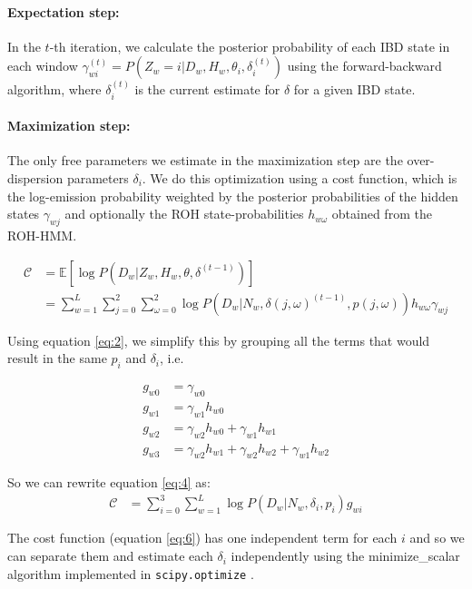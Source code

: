 \documentclass[12pt, letterpaper]{article}
\begin{document}
\paragraph{Expectation step:}
In the $t$-th iteration, we calculate the posterior probability of each IBD state in each window $\gamma^{(t)}_{wi} = P(Z_w=i | D_w, H_w, \theta_i, \delta_i^{(t)})$ using the forward-backward algorithm, where $\delta_i^{(t)}$ is the current estimate for $\delta$ for a given IBD state.

\paragraph{Maximization step:}
The only free parameters we estimate in the maximization step are the over-dispersion parameters $\delta_i$. We do this optimization using a cost function, which is the log-emission probability weighted by the posterior probabilities of the hidden states $\gamma_{wj}$ and optionally the ROH state-probabilities $h_{w\omega}$ obtained from the ROH-HMM.


\begin{align}\label{eq:4}
\mathcal{C} &= \mathbb{E}[\log P(D_w|Z_w, H_w, \theta, \delta^{(t-1)})]\nonumber\\
&= \sum_{w=1}^L \sum_{j=0}^2\sum^2_{\omega=0} \log P(D_{w}|N_w, \delta(j ,\omega)^{(t-1)}, p(j,\omega))h_{w\omega}\gamma_{wj}
\end{align}


Using equation \ref{eq:2}, we simplify this by grouping all the terms that would result in the same $p_i$ and $\delta_i$, i.e.

\begin{align*}\label{eq:5}
g_{w0} &= \gamma_{w0}\\
g_{w1} &= \gamma_{w1} h_{w0}\\
g_{w2} &= \gamma_{w2} h_{w0} + \gamma_{w1} h_{w1}\\
g_{w3} &= \gamma_{w2} h_{w1} + \gamma_{w2} h_{w2} + \gamma_{w1} h_{w2}
\end{align*}

So we can rewrite equation \ref{eq:4} as:
\begin{align}\label{eq:6}
\mathcal{C} &= \sum_{i=0}^3 \sum_{w=1}^L \log P(D_{w}|N_w, \delta_i, p_i)g_{wi}
\end{align}

The cost function (equation \ref{eq:6}) has one independent term for each $i$ and so we can separate them and estimate each $\delta_i$ independently using the minimize\_scalar algorithm implemented in \texttt{scipy.optimize} \cite{virtanen_scipy_2020}. 
\end{document}
